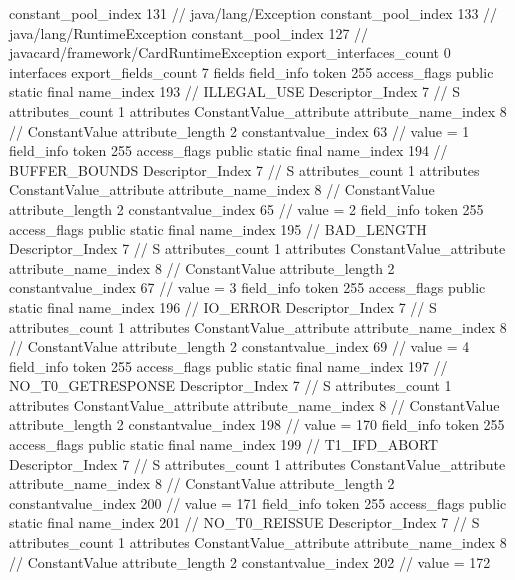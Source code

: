 {{{{				constant_pool_index	131		// java/lang/Exception
				constant_pool_index	133		// java/lang/RuntimeException
				constant_pool_index	127		// javacard/framework/CardRuntimeException
			}
			export_interfaces_count	0
			interfaces {
			}
			export_fields_count	7
			fields {
			field_info {
				token	255
				access_flags	public static final
				name_index	193		// ILLEGAL_USE
				Descriptor_Index	7		// S
				attributes_count	1
				attributes {
				ConstantValue_attribute {
					attribute_name_index	8		// ConstantValue
					attribute_length	2
					constantvalue_index	63		// value = 1
				}
				}
			}
			field_info {
				token	255
				access_flags	public static final
				name_index	194		// BUFFER_BOUNDS
				Descriptor_Index	7		// S
				attributes_count	1
				attributes {
				ConstantValue_attribute {
					attribute_name_index	8		// ConstantValue
					attribute_length	2
					constantvalue_index	65		// value = 2
				}
				}
			}
			field_info {
				token	255
				access_flags	public static final
				name_index	195		// BAD_LENGTH
				Descriptor_Index	7		// S
				attributes_count	1
				attributes {
				ConstantValue_attribute {
					attribute_name_index	8		// ConstantValue
					attribute_length	2
					constantvalue_index	67		// value = 3
				}
				}
			}
			field_info {
				token	255
				access_flags	public static final
				name_index	196		// IO_ERROR
				Descriptor_Index	7		// S
				attributes_count	1
				attributes {
				ConstantValue_attribute {
					attribute_name_index	8		// ConstantValue
					attribute_length	2
					constantvalue_index	69		// value = 4
				}
				}
			}
			field_info {
				token	255
				access_flags	public static final
				name_index	197		// NO_T0_GETRESPONSE
				Descriptor_Index	7		// S
				attributes_count	1
				attributes {
				ConstantValue_attribute {
					attribute_name_index	8		// ConstantValue
					attribute_length	2
					constantvalue_index	198		// value = 170
				}
				}
			}
			field_info {
				token	255
				access_flags	public static final
				name_index	199		// T1_IFD_ABORT
				Descriptor_Index	7		// S
				attributes_count	1
				attributes {
				ConstantValue_attribute {
					attribute_name_index	8		// ConstantValue
					attribute_length	2
					constantvalue_index	200		// value = 171
				}
				}
			}
			field_info {
				token	255
				access_flags	public static final
				name_index	201		// NO_T0_REISSUE
				Descriptor_Index	7		// S
				attributes_count	1
				attributes {
				ConstantValue_attribute {
					attribute_name_index	8		// ConstantValue
					attribute_length	2
					constantvalue_index	202		// value = 172
				}
				}
			}
}}}}
